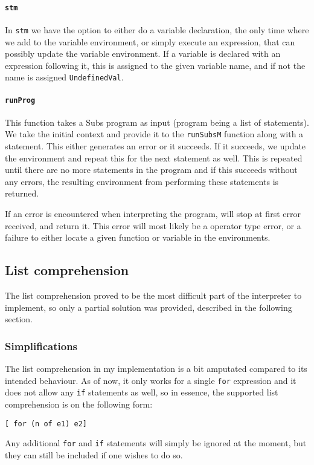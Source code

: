 \documentclass[a4paper]{article}
\begin{document}
\paragraph{\texttt{stm} }
\label{par:stm }
In \texttt{stm} we have the option to either do a variable declaration, the only time where we add to the variable environment, or simply execute an expression, that can possibly update the variable environment. If a variable is declared with an expression following it, this is assigned to the given variable name, and if not the name is assigned \texttt{UndefinedVal}.
\paragraph{\texttt{runProg}}
\label{par:runProg}
This function takes a Subs program as input (program being a list of statements). We take the initial context and provide it to the \texttt{runSubsM} function along with a statement. This either generates an error or it succeeds. If it succeeds, we update the environment and repeat this for the next statement as well. This is repeated until there are no more statements in the program and if this succeeds without any errors, the resulting environment from performing these statements is
returned.

If an error is encountered when interpreting the program, will stop at first error received, and return it. This error will most likely be a operator type error, or a failure to either locate a given function or variable in the environments.
\subsection{List comprehension}
\label{sub:List comprehension}
The list comprehension proved to be the most difficult part of the interpreter to implement, so only a partial solution was provided, described in the following section.
\subsubsection{Simplifications}
\label{ssub:Simplifications}
The list comprehension in my implementation is a bit amputated compared to its intended behaviour. As of now, it only works for a single \texttt{for} expression and it does not allow any \texttt{if} statements as well, so in essence, the supported list comprehension is on the following form:
\begin{center}
  \texttt{[ for (n of e1) e2]}
\end{center}
Any additional \texttt{for} and \texttt{if} statements will simply be ignored at the moment, but they can still be included if one wishes to do so.
\end{document}
